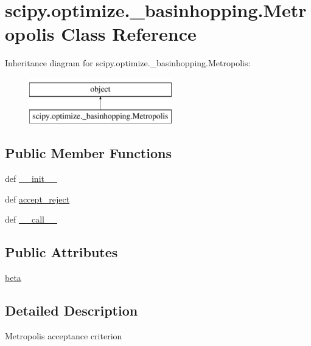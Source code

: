 \hypertarget{classscipy_1_1optimize_1_1__basinhopping_1_1Metropolis}{}\section{scipy.\+optimize.\+\_\+basinhopping.\+Metropolis Class Reference}
\label{classscipy_1_1optimize_1_1__basinhopping_1_1Metropolis}
Inheritance diagram for scipy.\+optimize.\+\_\+basinhopping.\+Metropolis\+:\begin{figure}[H]
\begin{center}
\leavevmode
\includegraphics[height=2.000000cm]{classscipy_1_1optimize_1_1__basinhopping_1_1Metropolis}
\end{center}
\end{figure}
\subsection*{Public Member Functions}
\begin{DoxyCompactItemize}
\item 
def \hyperlink{classscipy_1_1optimize_1_1__basinhopping_1_1Metropolis_a71b85713ac59cff0d3b5ba454b0f4e8f}{\+\_\+\+\_\+init\+\_\+\+\_\+}
\item 
def \hyperlink{classscipy_1_1optimize_1_1__basinhopping_1_1Metropolis_a44bc655d8caf97ad71954eff5655e946}{accept\+\_\+reject}
\item 
def \hyperlink{classscipy_1_1optimize_1_1__basinhopping_1_1Metropolis_a48d77234ad640af038c61b07585381a3}{\+\_\+\+\_\+call\+\_\+\+\_\+}
\end{DoxyCompactItemize}
\subsection*{Public Attributes}
\begin{DoxyCompactItemize}
\item 
\hyperlink{classscipy_1_1optimize_1_1__basinhopping_1_1Metropolis_ac2029e1f895b96934976b7880c050b1b}{beta}
\end{DoxyCompactItemize}


\subsection{Detailed Description}
\begin{DoxyVerb}Metropolis acceptance criterion
\end{DoxyVerb}
 

